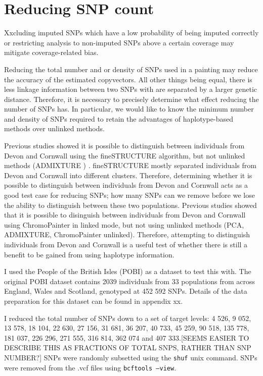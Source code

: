 \section{Reducing SNP count}

Xxcluding imputed SNPs which have a low probability of being imputed correctly or restricting analysis to non-imputed SNPs above a certain coverage may mitigate coverage-related bias.

Reducing the total number and or density of SNPs used in a painting may reduce the accuracy of the estimated copyvectors. All other things being equal, there is less linkage information between two SNPs with are separated by a larger genetic distance. Therefore, it is necessary to precisely determine what effect reducing the number of SNPs has. In particular, we would like to know the minimum number and density of SNPs required to retain the advantages of haplotype-based methods over unlinked methods. 

Previous studies showed it is possible to distinguish between individuals from Devon and Cornwall using the fineSTRUCTURE algorithm, but not unlinked methods (ADMIXTURE \cite{alexander2009fast}) \cite{Leslie2015}. fineSTRUCTURE mostly separated individuals from Devon and Cornwall into different clusters. Therefore, determining whether it is possible to distinguish between individuals from Devon and Cornwall acts as a good test case for reducing SNPs; how many SNPs can we remove before we lose the ability to distinguish between these two populations.
Previous studies showed that it is possible to disinguish between individuals from Devon and Cornwall using ChromoPainter in linked mode, but not using unlinked methods (PCA, ADMIXTURE, ChromoPainter unlinked). Therefore, attempting to distinguish individuals from Devon and Cornwall is a useful test of whether there is still a benefit to be gained from using haplotype information.  

I used the People of the British Isles (POBI) as a dataset to test this with. The original POBI dataset contains 2039 individuals from 33 populations from across England, Wales and Scotland, genotyped at 452 592 SNPs. Details of the data preparation for this dataset can be found in appendix xx.

I reduced the total number of SNPs down to a set of target levels: 4 526, 9 052, 13 578, 18 104, 22 630, 27 156, 31 681, 36 207, 40 733, 45 259, 90 518, 135 778, 181 037, 226 296, 271 555, 316 814, 362 074 and 407 333.{\color{red}[SEEMS EASIER TO DESCRIBE THIS AS FRACTIONS OF TOTAL SNPS, RATHER THAN SNP NUMBER?]} SNPs were randomly subsetted using the \texttt{shuf} unix command. SNPs were removed from the .vcf files using \texttt{bcftools --view}.

